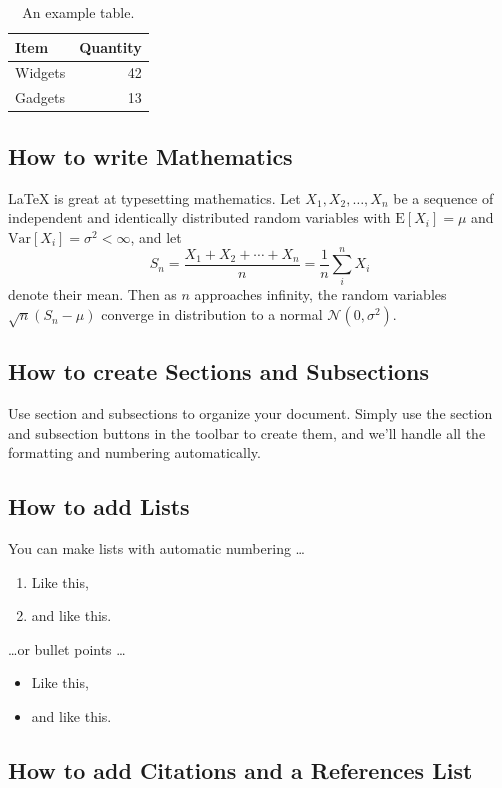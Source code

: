 \documentclass[10pt, a4paper]{article}
\begin{document}
\begin{table}
\centering
\begin{tabular}{l|r}
Item & Quantity \\\hline
Widgets & 42 \\
Gadgets & 13
\end{tabular}
\caption{\label{tab:widgets}An example table.}
\end{table}

\subsection{How to write Mathematics}

\LaTeX{} is great at typesetting mathematics. Let $X_1, X_2, \ldots, X_n$ be a sequence of independent and identically distributed random variables with $\text{E}[X_i] = \mu$ and $\text{Var}[X_i] = \sigma^2 < \infty$, and let
\[S_n = \frac{X_1 + X_2 + \cdots + X_n}{n}
      = \frac{1}{n}\sum_{i}^{n} X_i\]
denote their mean. Then as $n$ approaches infinity, the random variables $\sqrt{n}(S_n - \mu)$ converge in distribution to a normal $\mathcal{N}(0, \sigma^2)$.


\subsection{How to create Sections and Subsections}

Use section and subsections to organize your document. Simply use the section and subsection buttons in the toolbar to create them, and we'll handle all the formatting and numbering automatically.

\subsection{How to add Lists}

You can make lists with automatic numbering \dots

\begin{enumerate}
\item Like this,
\item and like this.
\end{enumerate}
\dots or bullet points \dots
\begin{itemize}
\item Like this,
\item and like this.
\end{itemize}

\subsection{How to add Citations and a References List}
\end{document}
